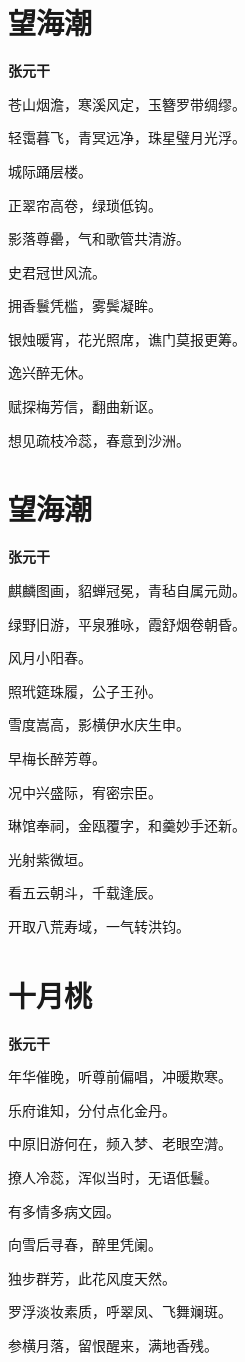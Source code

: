 \documentclass[12pt,a4paper]{ctexbook}
\begin{document}
\section{望海潮}
\textbf{张元干}\par\vspace{0.5em}
苍山烟澹，寒溪风定，玉簪罗带绸缪。\par
轻霭暮飞，青冥远净，珠星璧月光浮。\par
城际踊层楼。\par
正翠帘高卷，绿琐低钩。\par
影落尊罍，气和歌管共清游。\par
史君冠世风流。\par
拥香鬟凭槛，雾鬓凝眸。\par
银烛暖宵，花光照席，谯门莫报更筹。\par
逸兴醉无休。\par
赋探梅芳信，翻曲新讴。\par
想见疏枝冷蕊，春意到沙洲。\par

\section{望海潮}
\textbf{张元干}\par\vspace{0.5em}
麒麟图画，貂蝉冠冕，青毡自属元勋。\par
绿野旧游，平泉雅咏，霞舒烟卷朝昏。\par
风月小阳春。\par
照玳筵珠履，公子王孙。\par
雪度嵩高，影横伊水庆生申。\par
早梅长醉芳尊。\par
况中兴盛际，宥密宗臣。\par
琳馆奉祠，金瓯覆字，和羹妙手还新。\par
光射紫微垣。\par
看五云朝斗，千载逢辰。\par
开取八荒寿域，一气转洪钧。\par

\section{十月桃}
\textbf{张元干}\par\vspace{0.5em}
年华催晚，听尊前偏唱，冲暖欺寒。\par
乐府谁知，分付点化金丹。\par
中原旧游何在，频入梦、老眼空潸。\par
撩人冷蕊，浑似当时，无语低鬟。\par
有多情多病文园。\par
向雪后寻春，醉里凭阑。\par
独步群芳，此花风度天然。\par
罗浮淡妆素质，呼翠凤、飞舞斓斑。\par
参横月落，留恨醒来，满地香残。\par
\end{document}
